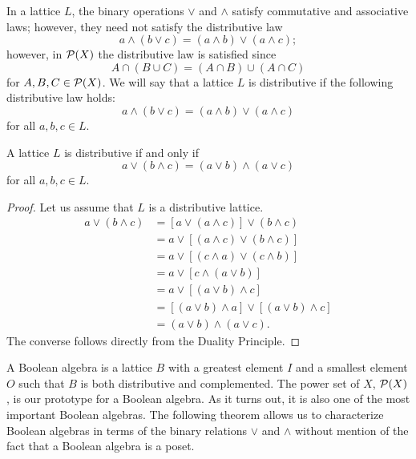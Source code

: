  
In a lattice $L$, the binary operations $\vee$ and $\wedge$ satisfy
commutative and associative laws; however, they need not satisfy the
distributive law 
\[ 
a \wedge ( b \vee c ) = (a \wedge b ) \vee ( a \wedge c );
\] 
however, in ${\cal P}(X)$ the distributive law is satisfied since
\[
A \cap ( B \cup C ) = (A \cap B ) \cup ( A \cap C )
\]
for $A, B, C \in {\cal P}(X)$. We will say that a lattice $L$ is
{\bfi distributive\/} if the following
distributive law holds:
\[
a \wedge ( b \vee c ) = (a \wedge b ) \vee ( a \wedge c )
\]
for all $a, b, c \in L$.
 
 
\begin{theorem}\label{boolean:dist_lattice_theorem}
A lattice $L$ is distributive if and only if 
\[
a \vee ( b \wedge c ) = ( a \vee b ) \wedge ( a \vee c )
\]
for all $a, b, c \in L$.
\end{theorem}
 
 
\begin{proof}
Let us assume that $L$ is a distributive lattice.
\begin{align*}
a \vee ( b \wedge c ) 
& = [a \vee (a \wedge c) ] \vee ( b \wedge c ) \\
& = a \vee [(a \wedge c)  \vee ( b \wedge c )] \\
& = a \vee [(c \wedge a)  \vee ( c \wedge b )] \\
& = a \vee [c \wedge ( a  \vee b )] \\
& = a \vee [( a  \vee b ) \wedge c ] \\
& = [( a  \vee b ) \wedge a ] \vee [(a \vee b) \wedge c ] \\
& = ( a \vee b ) \wedge ( a \vee c ).
\end{align*}
The converse follows directly from the Duality Principle.
\end{proof}
 
 
\medskip
 
 
A {\bfi Boolean algebra\/} is a
lattice $B$ with a greatest element $I$ and a smallest element $O$
such that $B$ is both distributive and complemented. The power set of
$X$, ${\cal P}(X)$, is our prototype for a Boolean algebra.  As it
turns out, it is also one of the most important Boolean algebras. The
following theorem allows us to characterize Boolean algebras in terms
of the binary relations $\vee$ and $\wedge$ without mention of the
fact that a Boolean algebra is a poset. 
 
